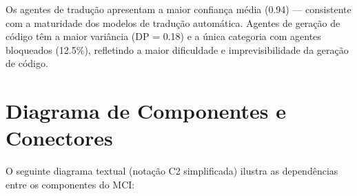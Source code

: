 Os agentes de tradução apresentam a maior confiança média (0.94) — consistente com a maturidade dos modelos de tradução automática. Agentes de geração de código têm a maior variância (DP = 0.18) e a única categoria com agentes bloqueados (12.5\%), refletindo a maior dificuldade e imprevisibilidade da geração de código.

\section{Diagrama de Componentes e Conectores}
\label{sec:component-diagram}

O seguinte diagrama textual (notação C2 simplificada) ilustra as dependências entre os componentes do MCI:

